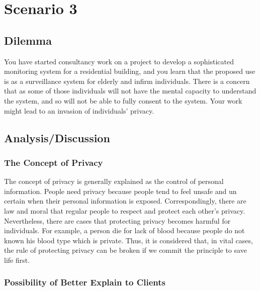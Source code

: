 \documentclass[11pt, a4paper]{article}
\begin{document}
\newpage

\section{Scenario 3}

\subsection{Dilemma}

You have started consultancy work on a project to develop a sophisticated monitoring system for a residential building, and you learn that the proposed use is as a surveillance system for elderly and infirm individuals. There is a concern that as some of those individuals will not have the mental capacity to understand the system, and so will not be able to fully consent to the system. Your work might lead to an invasion of individuals’ privacy.


\subsection{Analysis/Discussion}

\subsubsection{The Concept of Privacy}

The concept of privacy is generally explained as the control of personal information. People need privacy because people tend to feel unsafe and un certain when their personal information is exposed. Correspondingly, there are law and moral that regular people to respect and protect each other's privacy. Nevertheless, there are cases that protecting privacy becomes harmful for individuals. For example, a person die for lack of blood because people do not known his blood type which is private. Thus, it is considered that, in vital cases, the rule of protecting privacy can be broken if we commit the principle to save life first.

\subsubsection{Possibility of Better Explain to Clients}
\end{document}
